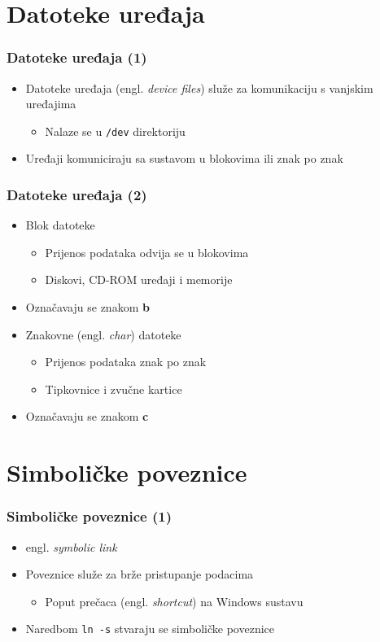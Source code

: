 \documentclass{beamer}
\newcommand{\shell}[1]{\texttt{\small #1}}
\begin{document}
\section{Datoteke uređaja}
\begin{frame}[t]
\frametitle{Datoteke uređaja (1)}
\begin{itemize}
  \item Datoteke uređaja (engl. \emph{device files}) služe za komunikaciju
        s vanjskim uređajima
  \begin{itemize}
    \item Nalaze se u \shell{/dev} direktoriju
  \end{itemize}
  \item Uređaji komuniciraju sa sustavom u blokovima ili znak po znak
\end{itemize}
\end{frame}

\begin{frame}[t]
\frametitle{Datoteke uređaja (2)}
\begin{itemize}
  \item Blok datoteke
  \begin{itemize}
    \item Prijenos podataka odvija se u blokovima
    \item Diskovi, CD-ROM uređaji i memorije
  \end{itemize}
  \item Označavaju se znakom \textbf{b}
  \item Znakovne (engl. \emph{char}) datoteke
  \begin{itemize}
    \item Prijenos podataka znak po znak
    \item Tipkovnice i zvučne kartice
  \end{itemize}
  \item Označavaju se znakom \textbf{c}
\end{itemize}
\end{frame}

\section{Simboličke poveznice}
\begin{frame}[t]
\frametitle{Simboličke poveznice (1)}
\begin{itemize}
  \item engl. \emph{symbolic link}
  \item Poveznice služe za brže pristupanje podacima
  \begin{itemize}
    \item Poput prečaca (engl. \emph{shortcut}) na Windows sustavu
  \end{itemize}
  \item Naredbom \shell{ln -s} stvaraju se simboličke poveznice
\end{itemize}
\end{frame}
\end{document}
